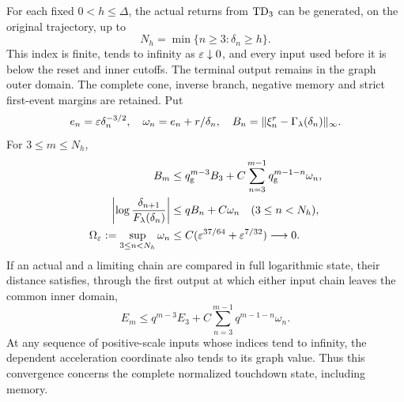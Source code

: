 \begin{lemma}
\label{path:stopped-cascade}
For each fixed $0<h\le\Delta$, the actual returns from $\mathrm{TD}_3$ can
be generated, on the original trajectory, up to
\[
 N_h=\min\{n\ge3:\delta_n\ge h\}.
\]
This index is finite, tends to infinity as $\varepsilon\downarrow0$, and
every input used before it is below the reset and inner cutoffs.
The terminal output remains in the graph outer domain.  The complete
cone, inverse branch, negative memory and strict first-event margins
are retained.  Put
\[
 e_n=\varepsilon\delta_n^{-3/2},\quad
 \omega_n=e_n+r/\delta_n,\quad
 B_n=\|\xi_n^r-\Gamma_\lambda(\delta_n)\|_\infty.
\]
For $3\le m\le N_h$,
\begin{align}
 B_m&\le q_{\rm g}^{m-3}B_3+
       C\sum_{n=3}^{m-1}q_{\rm g}^{m-1-n}\omega_n,
       \label{path:graph-budget}\\
 \left|\log\frac{\delta_{n+1}}{F_\lambda(\delta_n)}\right|
       &\le qB_n+C\omega_n\quad(3\le n<N_h),
       \label{path:same-base-output}\\
 \Omega_\varepsilon:=\sup_{3\le n<N_h}\omega_n
       &\le C(\varepsilon^{37/64}+\varepsilon^{7/32})\longrightarrow0.
       \label{path:uniform-defect}
\end{align}
If an actual and a limiting chain are compared in full logarithmic
state, their distance satisfies, through the first output at which
either input chain leaves the common inner domain,
\begin{equation}
 E_m\le q^{m-3}E_3+
          C\sum_{n=3}^{m-1}q^{m-1-n}\omega_n.
 \label{path:two-chain-budget}
\end{equation}
At any sequence of positive-scale inputs whose indices tend to
infinity, the dependent acceleration coordinate also tends to its
graph value.  Thus this convergence concerns the complete normalized
touchdown state, including memory.
\end{lemma}

